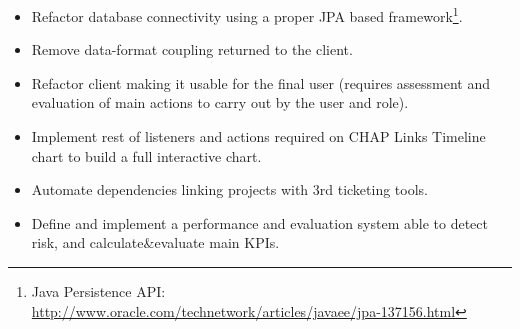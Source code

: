 \begin{itemize}
	\item Refactor database connectivity using a proper JPA based framework\footnote{Java Persistence API:
	\url{http://www.oracle.com/technetwork/articles/javaee/jpa-137156.html}}.
	\item Remove data-format coupling returned to the client.
	\item Refactor client making it usable for the final user (requires assessment
	and evaluation of main actions to carry out by the user and role).
	\item Implement rest of listeners and actions required on CHAP Links Timeline
	chart to build a full interactive chart.
	\item Automate dependencies linking projects with 3rd ticketing tools.
	\item Define and implement a performance and evaluation system able to detect
	risk, and calculate&evaluate main KPIs.
\end{itemize}

